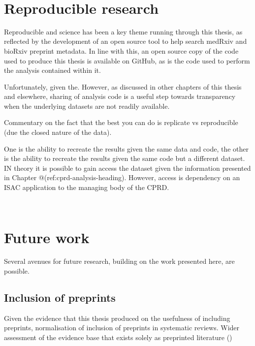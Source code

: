 \documentclass[a4paper, twoside]{templates/ociamthesis}
\begin{document}
~

\hypertarget{reproducible-research}{%
\section{Reproducible research}\label{reproducible-research}}

Reproducible and science has been a key theme running through this thesis, as reflected by the development of an open source tool to help search medRxiv and bioRxiv preprint metadata. In line with this, an open source copy of the code used to produce this thesis is available on GitHub, as is the code used to perform the analysis contained within it.

Unfortunately, given the. However, as discussed in other chapters of this thesis and elsewhere, sharing of analysis code is a useful step towards transparency when the underlying datasets are not readily available.

Commentary on the fact that the best you can do is replicate vs reproducible (due the closed nature of the data).

One is the ability to recreate the results given the same data and code, the other is the ability to recreate the results given the same code but a different dataset. IN theory it is possible to gain access the dataset given the information presented in Chapter @(ref:cprd-analysis-heading). However, access is dependency on an ISAC application to the managing body of the CPRD.

~

\hypertarget{future-work-1}{%
\section{Future work}\label{future-work-1}}

Several avenues for future research, building on the work presented here, are possible.

\hypertarget{inclusion-of-preprints-1}{%
\subsection{Inclusion of preprints}\label{inclusion-of-preprints-1}}

Given the evidence that this thesis produced on the usefulness of including preprints, normalisation of inclusion of preprints in systematic reviews. Wider assessment of the evidence base that exists solely as preprinted literature ()
\end{document}
